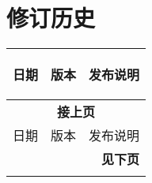 \chapter*{修订历史}\label{revision-history}

\begin{longtable}[l]{ | m{2cm} | m{1.5cm} | m{12cm} | }\hline

    \rowcolor{lightgray}
    日期 & 版本 & \hypertarget{Release notes}{发布说明}\\\hline
    \endfirsthead

    \multicolumn{3}{c}{\bfseries 接上页}\\\hline
    \rowcolor{lightgray}
    日期 & 版本 & 发布说明\\\hline
    \endhead

    \multicolumn{3}{r}{\textbf{见下页}}\\
    \endfoot

    \endlastfoot


\end{longtable}
